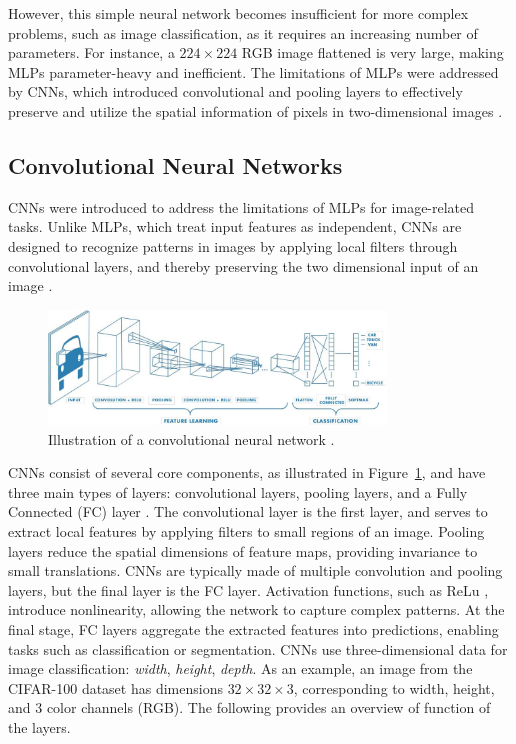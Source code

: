 However, this simple neural network becomes insufficient for more complex problems, such as image classification, as it requires an increasing number of parameters. For instance, a $224\times 224$ RGB image flattened is very large, making MLPs parameter-heavy and inefficient. The limitations of MLPs were addressed by CNNs, which introduced convolutional and pooling layers to effectively preserve and utilize the spatial information of pixels in two-dimensional images \cite{zhang2023dive}.



\subsection{Convolutional Neural Networks}
\label{sec:CNNs}
CNNs \cite{lecun1995} were introduced to address the limitations of MLPs for image-related tasks. Unlike MLPs, which treat input features as independent, CNNs are designed to recognize patterns in images by applying local filters through convolutional layers, and thereby preserving the two dimensional input of an image \cite{lecun1998,NIPS2012_c399862d,zhang2023dive}. 

\begin{figure}[ht]
    \centering
    \includegraphics[width=0.8\textwidth]{Images/CNN_illustration.jpg} 
    \caption{Illustration of a convolutional neural network \cite{mathworks_cnn}.}
    \label{fig:cnn_illustration}
\end{figure}

\noindent CNNs consist of several core components, as illustrated in Figure~\ref{fig:cnn_illustration}, and have three main types of layers: convolutional layers, pooling layers, and a Fully Connected (FC) layer \cite{cs231n}. The convolutional layer is the first layer, and serves to extract local features by applying filters to small regions of an image. Pooling layers reduce the spatial dimensions of feature maps, providing invariance to small translations. CNNs are typically made of multiple convolution and pooling layers, but the final layer is the FC layer. Activation functions, such as ReLu \cite{relu},  introduce nonlinearity, allowing the network to capture complex patterns. At the final stage, FC layers aggregate the extracted features into predictions, enabling tasks such as classification or segmentation. CNNs use three-dimensional data for image classification: \emph{width}, \emph{height}, \emph{depth}. As an example, an image from the CIFAR-100 dataset has dimensions $32\times 32\times 3$, corresponding to width, height, and 3 color channels (RGB). The following provides an overview of function of the layers.


